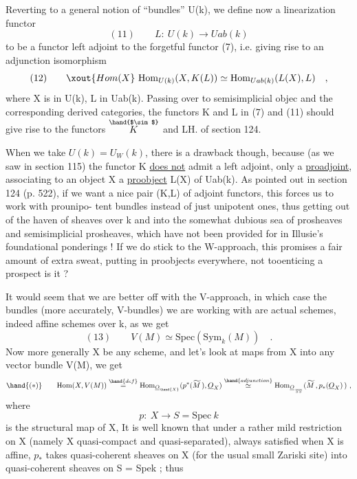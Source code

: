 
Reverting to a general notion of ``bundles'' U(k),  we define now a
linearization functor
\[ (11) \qquad L:\ U(k) \longrightarrow Uab(k) \]
to be a functor left adjoint to the forgetful functor (7),  i.e. giving
rise to an adjunction isomorphism
\[ (12) \qquad \xout{Hom(X} \ \mathrm{Hom}_{U(k)}(X, K(L)) \simeq \mathrm{Hom}_{Uab(k)}(L(X), L) \quad , \]
where X is in U(k),  L in Uab(k).  Passing over to semisimplicial objec
and the corresponding derived categories,  the functors K and L in
(7) and (11) should give rise to the functors $\overset{\hand{$\sim$}}{K}$ and LH.  of section
124.

When we take  $U(k) = U_W(k)$,  there is a drawback though,  because
(as we saw in section 115) the functor K \uline{does not} admit a left adjoint,
only a \uline{proadjoint},  associating to an object X a \uline{proobject} L(X) of
Uab(k).  As pointed out in section 124 (p. 522),  if we want a nice
pair (K,L) of adjoint functors,  this forces us to work with prounipo-%
tent bundles instead of just unipotent ones,  thus getting out of the
haven of sheaves over k and into the somewhat dubious sea of prosheaves
and semisimplicial prosheaves,  which have not been provided for in
Illusie's foundational ponderings !  If we do stick to the W-approach,
this promises   a fair amount of extra sweat,  putting in proobjects
everywhere,  not tooenticing a prospect is it ?

It would seem that we are better off with the V-approach,  in which
case the  bundles (more accurately, V-bundles) we are working 
with are actual schemes,  indeed affine schemes over k,  as we get
\[ (13) \qquad V(M) \simeq \mathrm{Spec}(\mathrm{Sym}_k(M)) \quad . \]
Now  more generally X be any scheme,  and let's look at maps from
X into any vector bundle V(M),  we get
\[ \hand{(*)} \qquad \mathrm{Hom}(X,V(M)) \overset{\hand{def}}{=} \mathrm{Hom}_{\underline{O}_{\hand{X}}}(p^*(\widetilde{M}\,), \underline{O}_X) \overset{\hand{adjunction}}{\simeq} \mathrm{Hom}_{\underline{O}_{\over{S}{S}}}(\widetilde{M}\,, p_*(\underline{O}_X)\,)\ , \]
where
\[ p:\ X \longrightarrow S = \mathrm{Spec}\ k \]
is the structural map of X, It is well known that under a rather mild
restriction on X (namely X  quasi-compact and quasi-separated),
always satisfied when X is affine,  $p_*$ takes quasi-coherent sheaves on
X (for the usual small Zariski site) into quasi-coherent sheaves on
S = Spek ;  thus 

